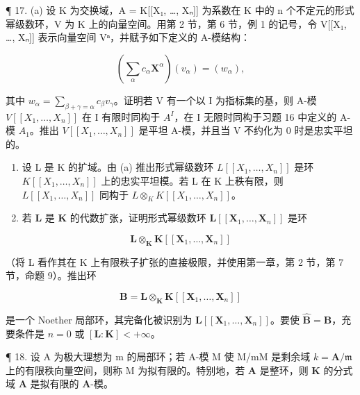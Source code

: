 ¶ 17. (a) 设 K 为交换域，A = K{[}{[}X₁, \ldots, Xₙ{]}{]} 为系数在 K 中的 n 个不定元的形式幂级数环，V 为 K 上的向量空间。用第 2 节，第 6 节，例 1 的记号，令 V{[}{[}X₁, \ldots, Xₙ{]}{]} 表示向量空间 Vⁿ，并赋予如下定义的 A-模结构：

\[
\left(\sum_ {\alpha} c _ {\alpha} \mathbf {X} ^ {\alpha}\right) (v _ {\alpha}) = (w _ {\alpha}),
\]

其中 \(w_{\alpha} = \sum_{\beta + \gamma = \alpha} c_{\beta} v_{\gamma}\)。证明若 V 有一个以 I 为指标集的基，则 A-模 \(V[[X_1, \ldots, X_n]]\) 在 I 有限时同构于 \(A^I\)，在 I 无限时同构于习题 16 中定义的 A-模 \(A_1\)。推出 \(V[[X_1, \ldots, X_n]]\) 是平坦 A-模，并且当 V 不约化为 0 时是忠实平坦的。

\begin{enumerate}
\def\labelenumi{(\alph{enumi})}
\setcounter{enumi}{1}
\item
  设 L 是 K 的扩域。由 (a) 推出形式幂级数环 \(L[[X_{1},\ldots,X_{n}]]\) 是环 \(K[[X_{1},\ldots,X_{n}]]\) 上的忠实平坦模。若 L 在 K 上秩有限，则 \(L[[X_{1},\ldots,X_{n}]]\) 同构于 \(L\otimes_{K}K[[X_{1},\ldots,X_{n}]]\)。
\item
  若 \(\mathbf{L}\) 是 \(\mathbf{K}\) 的代数扩张，证明形式幂级数环 \(\mathbf{L}[[\mathbf{X}_1, \ldots, \mathbf{X}_n]]\) 是环
\end{enumerate}

\[
\mathbf {L} \otimes_ {\mathbf {K}} \mathbf {K} [ [ \mathbf {X} _ {1}, \dots , \mathbf {X} _ {n} ] ]
\]

（将 L 看作其在 K 上有限秩子扩张的直接极限，并使用第一章，第 2 节，第 7 节，命题 9）。推出环

\[
\mathbf {B} = \mathbf {L} \otimes_ {\mathbf {K}} \mathbf {K} [ [ \mathbf {X} _ {1}, \dots , \mathbf {X} _ {n} ] ]
\]

是一个 Noether 局部环，其完备化被识别为 \(\mathbf{L}[[\mathbf{X}_1,\ldots ,\mathbf{X}_n]]\)。要使 \(\hat{\mathbf{B}} = \mathbf{B}\)，充要条件是 \(n = 0\) 或 \([\mathbf{L}:\mathbf{K}] < +\infty\)。

¶ 18. 设 A 为极大理想为 m 的局部环；若 A-模 M 使 M/mM 是剩余域 \(k = \mathbf{A} / \mathfrak{m}\) 上的有限秩向量空间，则称 M 为拟有限的。特别地，若 \(\mathbf{A}\) 是整环，则 \(\mathbf{K}\) 的分式域 \(\mathbf{A}\) 是拟有限的 \(\mathbf{A}\)-模。

